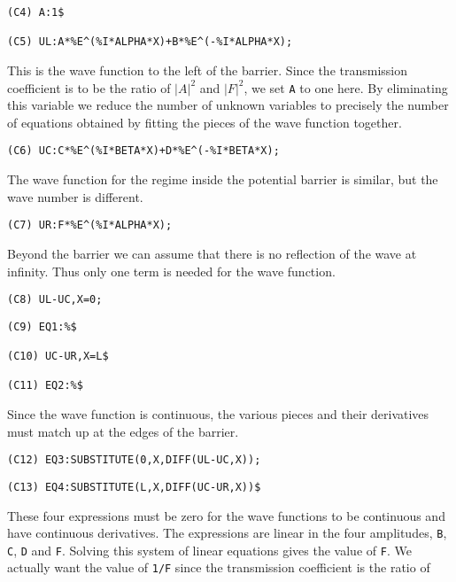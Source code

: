 \begin{verbatim}
(C4) A:1$

(C5) UL:A*%E^(%I*ALPHA*X)+B*%E^(-%I*ALPHA*X);
\end{verbatim}
This is the wave function to the left of the barrier.  Since the 
transmission coefficient is to be the ratio of $|A|^2$ and $|F|^2$, we
set {\tt A} to one here.  By eliminating this variable we reduce the number of
unknown variables to precisely the number of equations obtained by
fitting the pieces of the wave function together.
\begin{verbatim}
(C6) UC:C*%E^(%I*BETA*X)+D*%E^(-%I*BETA*X);
\end{verbatim}
The wave function for the regime inside the potential barrier is similar,
but the wave number is different.
\begin{verbatim}
(C7) UR:F*%E^(%I*ALPHA*X);
\end{verbatim}
Beyond the barrier we can assume that there is no reflection of the wave
at infinity.  Thus only one term is needed for the wave function.
\begin{verbatim}
(C8) UL-UC,X=0;
\end{verbatim}
\begin{verbatim}
(C9) EQ1:%$

(C10) UC-UR,X=L$

(C11) EQ2:%$
\end{verbatim}
Since the wave function is continuous, the various pieces and their
derivatives must match up at the edges of the barrier.
\begin{verbatim}
(C12) EQ3:SUBSTITUTE(0,X,DIFF(UL-UC,X));
\end{verbatim}
\begin{verbatim}
(C13) EQ4:SUBSTITUTE(L,X,DIFF(UC-UR,X))$
\end{verbatim}
These four expressions must be zero for the wave functions to be continuous
and have continuous derivatives.  The expressions are linear in the four
amplitudes, {\tt B}, {\tt C}, {\tt D} and {\tt F}.  Solving this system of
linear equations gives the value of {\tt F}.  We actually want 
the value of {\tt 1/F} since the transmission coefficient is the ratio of
